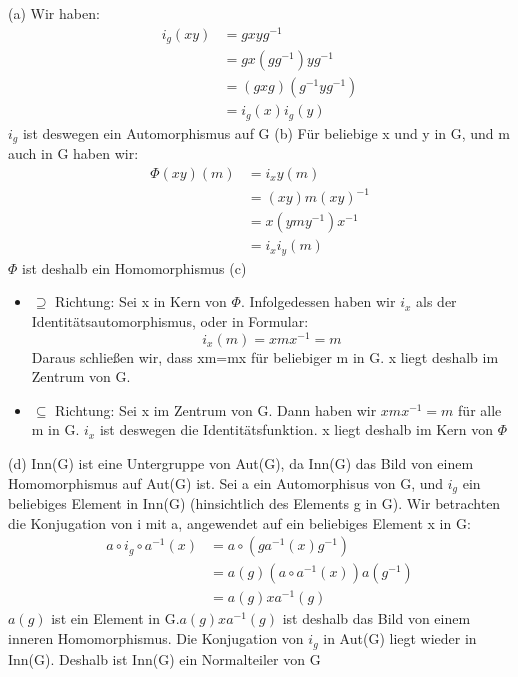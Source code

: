 \documentclass{homework}
\begin{document}
\begin{solution}
    (a) Wir haben:
    \begin{align*}
        i_g(xy) &= gxyg^{-1}  \tag*{(nach Definition)} \\
               &= gx(gg^{-1})yg^{-1} \\
               &= (gxg)(g^{-1}yg^{-1}) \\
               &= i_g(x)i_g(y)
     \end{align*}
$i_g$ ist deswegen ein Automorphismus auf G \newline
(b)
Für beliebige x und y in G, und m auch in G haben wir:
\begin{align*}
    \Phi(xy)(m) &= i_xy(m) \\
            &= (xy)m(xy)^{-1} \tag*{(nach Definition)} \\
            &= x(ymy^{-1})x^{-1} \\
            &= i_xi_y(m)
\end{align*}
$\Phi$ ist deshalb ein Homomorphismus \newline
(c)
\begin{itemize}
    \item $\supseteq$ Richtung: Sei x in Kern von $\Phi$. Infolgedessen haben wir $i_x$ als der Identitätsautomorphismus, oder in Formular:\[
        i_x(m) = xmx^{-1} = m \tag*{(für beliebiger m in G)}
    \]
    Daraus schließen wir, dass xm=mx für beliebiger m in G. x liegt deshalb im Zentrum von G.
    \item $\subseteq$ Richtung: Sei x im Zentrum von G. Dann haben wir $xmx^{-1} = m$ für alle m in G. $i_x$ ist deswegen die Identitätsfunktion. x liegt deshalb im Kern von $\Phi$
\end{itemize}
(d) Inn(G) ist eine Untergruppe von Aut(G), da Inn(G) das Bild von einem Homomorphismus auf Aut(G) ist. Sei a ein Automorphisus von G, und $i_g$ ein beliebiges Element in Inn(G) (hinsichtlich des Elements g in G). Wir betrachten die Konjugation von i mit a, angewendet auf ein beliebiges Element x in G:
\begin{align*}
    a \circ i_g \circ a^{-1} (x)&= a \circ (ga^{-1} (x)g^{-1}) \\
    &= a(g) (a \circ a^{-1} (x)) a(g^{-1}) \tag*{(Da a ist ein Automorphismus ist)} \\
    &= a(g)x a^{-1}(g)
\end{align*}
$a(g)$ ist ein Element in G.$a(g)x a^{-1}(g)$ ist deshalb das Bild von einem inneren Homomorphismus. Die Konjugation von $i_g$ in Aut(G) liegt wieder in Inn(G). Deshalb ist Inn(G) ein Normalteiler von G

\end{solution}
\end{document}
